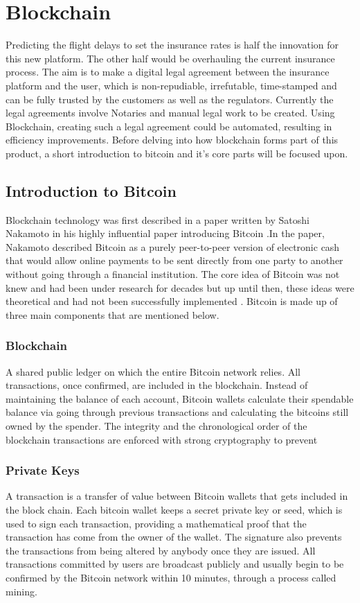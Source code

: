\chapter{Blockchain}

Predicting the flight delays to set the insurance rates is half the innovation for this new platform. The other half would be overhauling the current insurance process. The aim is to make a digital legal agreement between the insurance platform and the user, which is non-repudiable, irrefutable, time-stamped and can be fully trusted by the customers as well as the regulators. Currently the legal agreements involve Notaries and manual legal work to be created. Using Blockchain, creating such a legal agreement could be automated, resulting in efficiency improvements. Before delving into how blockchain forms part of this product, a short introduction to bitcoin and it's core parts will be focused upon. 

\section{Introduction to Bitcoin}
Blockchain technology was first described in a paper written by Satoshi Nakamoto in his highly influential paper introducing Bitcoin \cite{Nakamoto2008Bitcoin:System}.In the paper, Nakamoto described Bitcoin as a purely peer-to-peer version of electronic cash that would allow online payments to be sent directly from one party to another without going through a financial institution. The core idea of Bitcoin was not knew and had been under research for decades but up until then, these ideas were theoretical and had not been successfully implemented \cite{Chaum1983BlindPayments}. Bitcoin is made up of three main components that are mentioned below\cite{Economist2013HowWork}.

\subsection{Blockchain}
A shared public ledger on which the entire Bitcoin network relies. All  transactions, once confirmed, are included in the blockchain. Instead of maintaining the balance of each account, Bitcoin wallets calculate their spendable balance via going through previous transactions and calculating the bitcoins  still owned by the spender. The integrity and the chronological order of the blockchain transactions are enforced with strong cryptography to prevent %

\subsection{Private Keys}
A transaction is a transfer of value between Bitcoin wallets that gets included in the block chain. Each bitcoin wallet keeps a secret  private key or seed, which is used to sign each transaction, providing a mathematical proof that the transaction has come from the owner of the wallet. The signature also prevents the transactions from being altered by anybody once they are issued. All transactions committed by users are broadcast publicly and usually begin to be confirmed by the Bitcoin network within 10 minutes, through a process called mining.

